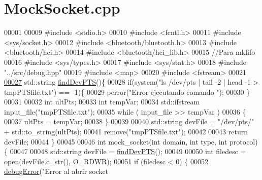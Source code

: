 \hypertarget{MockSocket_8cpp_source}{}\section{Mock\+Socket.\+cpp}
\label{MockSocket_8cpp_source}

\begin{DoxyCode}
00001 
00009 \textcolor{preprocessor}{#include <stdio.h>}
00010 \textcolor{preprocessor}{#include <fcntl.h>}
00011 \textcolor{preprocessor}{#include <sys/socket.h>}
00012 \textcolor{preprocessor}{#include <bluetooth/bluetooth.h>}
00013 \textcolor{preprocessor}{#include <bluetooth/hci.h>}
00014 \textcolor{preprocessor}{#include <bluetooth/hci\_lib.h>}
00015 \textcolor{comment}{//Para mkfifo}
00016 \textcolor{preprocessor}{#include <sys/types.h>}
00017 \textcolor{preprocessor}{#include <sys/stat.h>}
00018 \textcolor{preprocessor}{#include "../src/debug.hpp"}
00019 \textcolor{preprocessor}{#include <map>}
00020 \textcolor{preprocessor}{#include <fstream>}
00021 
\hyperlink{MockSocket_8cpp_a33fe4c99996c8de03c33962525663851}{00027} std::string \hyperlink{MockSocket_8cpp_a33fe4c99996c8de03c33962525663851}{findDevPTS}()\{
00028     \textcolor{keywordflow}{if}(system(\textcolor{stringliteral}{"ls /dev/pts | tail -2 | head -1 > tmpPTSfile.txt"}) == -1)\{
00029         perror(\textcolor{stringliteral}{"Error ejecutando comando "});
00030     \}
00031 
00032     \textcolor{keywordtype}{int} ultPts;
00033     \textcolor{keywordtype}{int} tempVar;
00034     std::ifstream input\_file(\textcolor{stringliteral}{"tmpPTSfile.txt"});
00035     \textcolor{keywordflow}{while} ( input\_file >> tempVar )
00036     \{
00037         ultPts = tempVar;
00038     \}
00039 
00040     std::string devFile = \textcolor{stringliteral}{"/dev/pts/"} + std::to\_string(ultPts);
00041     \textcolor{keyword}{remove}(\textcolor{stringliteral}{"tmpPTSfile.txt"});
00042 
00043     \textcolor{keywordflow}{return} devFile;
00044 \}
00045 
00046 \textcolor{keywordtype}{int} mock\_socket(\textcolor{keywordtype}{int} domain, \textcolor{keywordtype}{int} type, \textcolor{keywordtype}{int} protocol)\{
00047 
00048     std::string devFile = \hyperlink{MockSocket_8cpp_a33fe4c99996c8de03c33962525663851}{findDevPTS}();
00049 
00050     \textcolor{keywordtype}{int} filedesc = open(devFile.c\_str(), O\_RDWR);
00051     \textcolor{keywordflow}{if} (filedesc < 0) \{
00052         \hyperlink{debug_8hpp_a06cd512b8b15b6da31a5a557445f7027}{debugError}(\textcolor{stringliteral}{"Error al abrir socket %
}
\end{DoxyCode}
